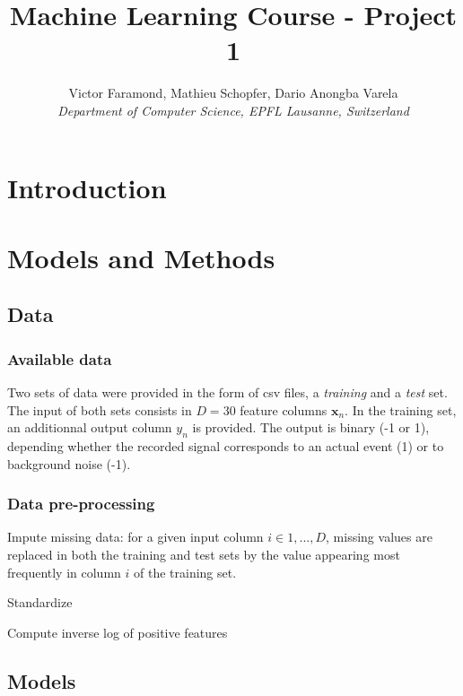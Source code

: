 \documentclass[10pt,conference,compsocconf]{IEEEtran}
\begin{document}
\title{Machine Learning Course - Project 1}

\author{
  Victor Faramond, Mathieu Schopfer, Dario Anongba Varela\\
  \textit{Department of Computer Science, EPFL Lausanne, Switzerland}
}

\maketitle

\begin{abstract}
\end{abstract}

\section{Introduction}

\section{Models and Methods}

\subsection{Data}

\subsubsection{Available data}
Two sets of data were provided in the form of csv files, a \textit{training} and a \textit{test} set. The input of both sets consists in $D=30$ feature columns $\mathbf{x}_n$. In the training set, an additionnal output column $y_n$ is provided. The output is binary (-1 or 1), depending whether the recorded signal corresponds to an actual event (1) or to background noise (-1).

\subsubsection{Data pre-processing}
Impute missing data: for a given input column $i \in {1, ..., D}$, missing values are replaced in both the training and test sets by the value appearing most frequently in column $i$ of the training set.

Standardize

Compute inverse log of positive features

\subsection{Models}
\end{document}
